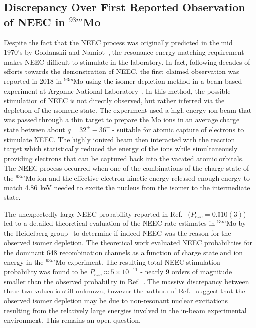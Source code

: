 \documentclass[12pt]{article}
\begin{document}
\subsection{\label{discrepancy}Discrepancy Over First Reported Observation of NEEC in $^{93m}$Mo}
Despite the fact that the NEEC process was originally predicted in the mid 1970's by Goldanskii and Namiot~\cite{Gol76}, the resonance energy-matching requirement makes NEEC difficult to stimulate in the laboratory.  In fact, following decades of efforts towards the demonstration of NEEC, the first claimed observation was reported in 2018 in $^{93m}$Mo using the isomer depletion method in a beam-based experiment at Argonne National Laboratory~\cite{Chi18}.  In this method, the possible stimulation of NEEC is not directly observed, but rather inferred via the depletion of the isomeric state.  The experiment used a high-energy ion beam that was passed through a thin target to prepare the Mo ions in an average charge state between about $q=32^+-36^+$ - suitable for atomic capture of electrons to stimulate NEEC. The highly ionized beam then interacted with the reaction target which statistically reduced the energy of the ions while simultaneously providing electrons that can be captured back into the vacated atomic orbitals.  The NEEC process occurred when one of the combinations of the charge state of the $^{93m}$Mo ion and the effective electron kinetic energy released enough energy to match 4.86~keV needed to excite the nucleus from the isomer to the intermediate state.

The unexpectedly large NEEC probability reported in Ref.~\cite{Chi18} ($P_{exc}=0.010(3)$) led to a detailed theoretical evaluation of the NEEC rate estimates in $^{93m}$Mo by the Heidelberg group~\cite{Pal19} to determine if indeed NEEC was the reason for the observed isomer depletion.  The theoretical work evaluated NEEC probabilities for the dominant 648 recombination channels as a function of charge state and ion energy in the $^{93m}$Mo experiment.  The resulting total NEEC stimulation probability was found to be $P_{exc}\approx5\times10^{-11}$ - nearly 9 orders of magnitude smaller than the observed probability in Ref.~\cite{Chi18}.  The massive discrepancy between these two values is still unknown, however the authors of Ref.~\cite{Pal19} suggest that the observed isomer depletion may be due to non-resonant nuclear excitations resulting from the relatively large energies involved in the in-beam experimental environment.  This remains an open question.
\end{document}
